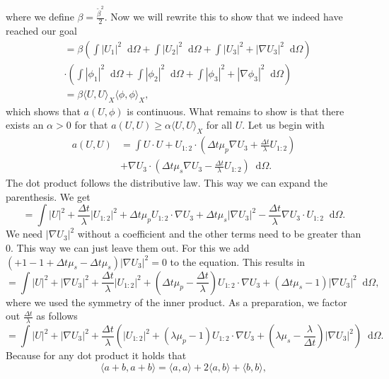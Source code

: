 \documentclass[12pt,a4paper,twoside, open=right]{scrreprt}
\theoremstyle{definition}
\theoremstyle{plain}
\newcommand{\abs}[1]{\left\vert #1\right\vert}
\newcommand{\D}{\mathop{}\!\mathrm{d}}
\begin{document}
where we define $\beta=\frac{\tilde\beta^2}{2}$. Now we will rewrite this to show that we indeed have reached our goal
\begin{align}
    &=\beta\left(\int\abs{U_1}^2\D\Omega +\int\abs{U_2}^2\D\Omega +\int\abs{U_3}^2+\abs{\nabla U_3}^2\D\Omega \right)\\ &\cdot\left(\int\abs{\phi_1}^2\D\Omega +\int\abs{\phi_2}^2\D\Omega +\int\abs{\phi_3}^2+\abs{\nabla \phi_3}^2\D\Omega \right)\\
    &=\beta \langle U,U\rangle_X \langle \phi,\phi\rangle_X,
\end{align} which shows that $a(U,\phi)$ is continuous. What remains to show is that there exists an $\alpha>0$ for that $a(U,U)\ge \alpha\langle U,U\rangle_X$ for all $U$. Let us begin with
\begin{align}
    a(U,U)&=\int U\cdot U+U_{1:2}\cdot\left(\Delta t\mu_p\nabla U_3+\frac{\Delta t}{\lambda}U_{1:2}\right)\\
    &+\nabla U_3\cdot\left(\Delta t\mu_s\nabla U_3 -\frac{\Delta t}{\lambda}U_{1:2}\right)\D\Omega.
\end{align}
The dot product follows the distributive law. This way we can expand the parenthesis. We get
\begin{equation}
    =\int\abs{U}^2+\frac{\Delta t}{\lambda}\abs{U_{1:2}}^2+\Delta t\mu_p U_{1:2}\cdot\nabla U_3
    +\Delta t\mu_s\abs{\nabla U_3}^2-\frac{\Delta t}{\lambda}\nabla U_3\cdot U_{1:2}\D\Omega.
\end{equation} 
We need $\abs{\nabla U_3}^2$ without a coefficient and the other terms need to be greater than 0. This way we can just leave them out. For this we add $(+1-1+\Delta t\mu_s -\Delta t\mu_s)\abs{\nabla U_3}^2=0$ to the equation. This results in 
\begin{equation}
     =\int\abs{U}^2+\abs{\nabla U_3}^2+\frac{\Delta t}{\lambda}\abs{U_{1:2}}^2+(\Delta t\mu_p-\frac{\Delta t}{\lambda}) U_{1:2}\cdot\nabla U_3
    +(\Delta t\mu_s-1)\abs{\nabla U_3}^2\D\Omega,
\end{equation} 
where we used the symmetry of the inner product. As a preparation, we factor out $\frac{\Delta t}{\lambda}$ as follows 
\begin{equation}
    =\int\abs{U}^2+\abs{\nabla U_3}^2+\frac{\Delta t}{\lambda}\left(\abs{U_{1:2}}^2+(\lambda\mu_p-1)U_{1:2}\cdot\nabla U_3+(\lambda\mu_s-\frac{\lambda}{\Delta t})\abs{\nabla U_3}^2 \right)\D\Omega.\label{eq:ref1}
\end{equation}
Because for any dot product it holds that
\begin{equation}
    \langle a+b,a+b\rangle=\langle a,a\rangle+2\langle a,b\rangle + \langle b,b\rangle,
\end{equation}
\end{document}
